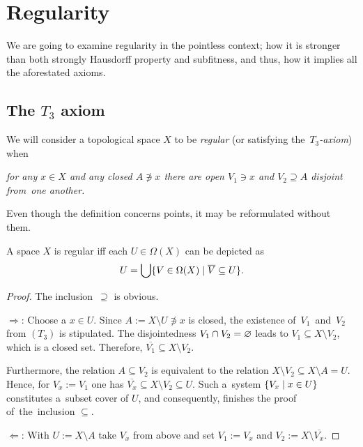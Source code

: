 \chapter{Regularity}

We are going to examine regularity in the pointless context;
how it is stronger than both strongly Hausdorff property and subfitness, and
thus, how it implies all the aforestated axioms.

\section{The $T_3$ axiom}

\begin{framed}
  \begin{df}[$T_3$]
    We will consider a topological space $X$ to be \emph{regular\/} (or
    satisfying the~\emph{$T_3$-axiom\/}) when
    \begin{center} \it
      for any $x\in X$ and any closed $A \not\owns x$ there are open $V_1\owns
      x$ and $V_2\supseteq A$ disjoint from~one another.
    \end{center}
  \end{df}
\end{framed}

Even though the definition concerns points, it may be reformulated without
them.

\begin{prop} \label{reg-char}
  A space $X$ is regular iff each $U\in \Omega(X)$ can be depicted as
  \[
    U = \bigcup \{V\in \Omega(X) \mid \overline{V} \subseteq U\}.
  \]
\end{prop}
\begin{proof}
  The inclusion~$\supseteq$ is obvious.

  $\Rightarrow$:
  Choose a $x\in U$.
  Since $A := X\setminus U \not\owns x$ is closed, the existence
  of~$V_1$~and~$V_2$ from $(T_3)$ is stipulated.
  The disjointedness $V_1 \cap V_2 = \varnothing$ leads to $V_1\subseteq X\setminus
  V_2$, which is a closed set.
  Therefore, $\overline{V_1}\subseteq X\setminus V_2$.

  Furthermore, the relation $A\subseteq V_2$ is equivalent to the relation
  $X\setminus V_2\subseteq X \setminus A = U$.
  Hence, for $V_x := V_1$ one has $\overline{V_x}\subseteq X\setminus V_2\subseteq
  U$.
  Such a~system $\{V_x \mid x\in U\}$ constitutes a~subset cover of $U$, and
  consequently, finishes the proof of~the~inclusion $\subseteq$.

  $\Leftarrow$:
  With $U := X\setminus A$ take $V_x$ from above and set $V_1 := V_x$ and $V_2
  := X\setminus \overline{V_x}$.
\end{proof}

